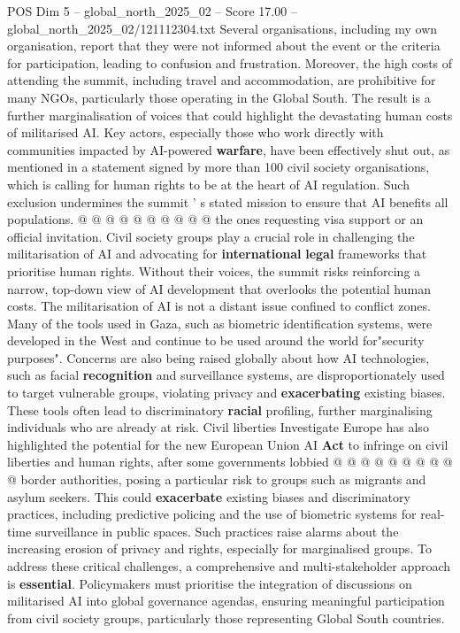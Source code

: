 \begin{textsample}{POS Dim 5 – global\_north\_2025\_02 – Score 17.00 – global\_north\_2025\_02/121112304.txt}
Several organisations, including my own organisation, report that they were not informed about the event or the criteria for participation, leading to confusion and frustration.
Moreover, the high costs of attending the summit, including travel and accommodation, are prohibitive for many NGOs, particularly those operating in the Global South.
The result is a further marginalisation of voices that could highlight the devastating human costs of militarised AI.
Key actors, especially those who work directly with communities impacted by AI-powered \textbf{warfare}, have been effectively shut out, as mentioned in a statement signed by more than 100 civil society organisations, which is calling for human rights to be at the heart of AI regulation.
Such exclusion undermines the summit ' s stated mission to ensure that AI benefits all populations. @ @ @ @ @ @ @ @ @ @ the ones requesting visa support or an official invitation.
Civil society groups play a crucial role in challenging the militarisation of AI and advocating for \textbf{international} \textbf{legal} frameworks that prioritise human rights.
Without their voices, the summit risks reinforcing a narrow, top-down view of AI development that overlooks the potential human costs.
The militarisation of AI is not a distant issue confined to conflict zones.
Many of the tools used in Gaza, such as biometric identification systems, were developed in the West and continue to be used around the world for"security purposes".
Concerns are also being raised globally about how AI technologies, such as facial \textbf{recognition} and surveillance systems, are disproportionately used to target vulnerable groups, violating privacy and \textbf{exacerbating} existing biases.
These tools often lead to discriminatory \textbf{racial} profiling, further marginalising individuals who are already at risk.
Civil liberties Investigate Europe has also highlighted the potential for the new European Union AI \textbf{Act} to infringe on civil liberties and human rights, after some governments lobbied @ @ @ @ @ @ @ @ @ @ border authorities, posing a particular risk to groups such as migrants and asylum seekers.
This could \textbf{exacerbate} existing biases and discriminatory practices, including predictive policing and the use of biometric systems for real-time surveillance in public spaces.
Such practices raise alarms about the increasing erosion of privacy and rights, especially for marginalised groups.
To address these critical challenges, a comprehensive and multi-stakeholder approach is \textbf{essential}.
Policymakers must prioritise the integration of discussions on militarised AI into global governance agendas, ensuring meaningful participation from civil society groups, particularly those representing Global South countries.

\end{textsample}
